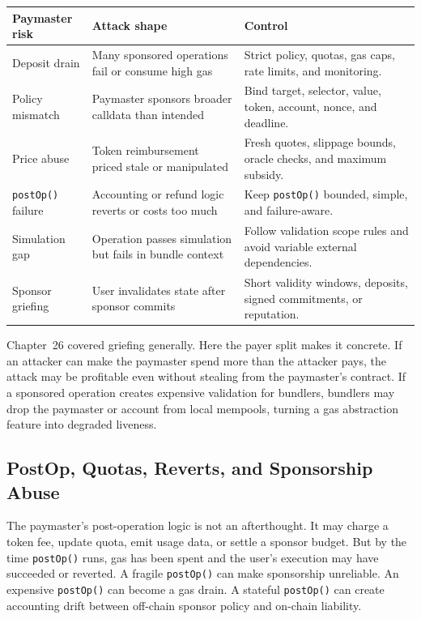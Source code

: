 \begin{table}[htbp]
\centering
\small
\renewcommand{\arraystretch}{1.14}
\begin{tabularx}{\textwidth}{@{}>{\RaggedRight\arraybackslash}p{}>{\RaggedRight\arraybackslash}p{}X@{}}
\toprule
Paymaster risk & Attack shape & Control \\
\midrule
Deposit drain & Many sponsored operations fail or consume high gas & Strict policy, quotas, gas caps, rate limits, and monitoring. \\
Policy mismatch & Paymaster sponsors broader calldata than intended & Bind target, selector, value, token, account, nonce, and deadline. \\
Price abuse & Token reimbursement priced stale or manipulated & Fresh quotes, slippage bounds, oracle checks, and maximum subsidy. \\
\texttt{postOp()} failure & Accounting or refund logic reverts or costs too much & Keep \texttt{postOp()} bounded, simple, and failure-aware. \\
Simulation gap & Operation passes simulation but fails in bundle context & Follow validation scope rules and avoid variable external dependencies. \\
Sponsor griefing & User invalidates state after sponsor commits & Short validity windows, deposits, signed commitments, or reputation. \\
\bottomrule
\end{tabularx}
\end{table}

Chapter~26 covered griefing generally. Here the payer split makes it concrete. If an attacker can make the paymaster spend more than the attacker pays, the attack may be profitable even without stealing from the paymaster's contract. If a sponsored operation creates expensive validation for bundlers, bundlers may drop the paymaster or account from local mempools, turning a gas abstraction feature into degraded liveness.

\subsection{PostOp, Quotas, Reverts, and Sponsorship Abuse}

The paymaster's post-operation logic is not an afterthought. It may charge a token fee, update quota, emit usage data, or settle a sponsor budget. But by the time \texttt{postOp()} runs, gas has been spent and the user's execution may have succeeded or reverted. A fragile \texttt{postOp()} can make sponsorship unreliable. An expensive \texttt{postOp()} can become a gas drain. A stateful \texttt{postOp()} can create accounting drift between off-chain sponsor policy and on-chain liability.

